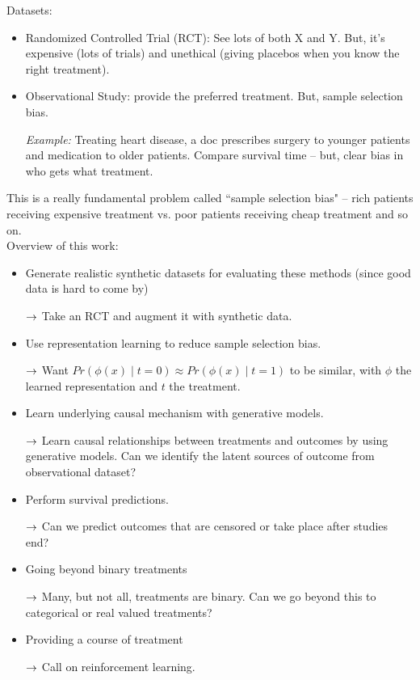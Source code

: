 Datasets:
\begin{itemize}
    \item Randomized Controlled Trial (RCT): See lots of both X and Y. But, it's expensive (lots of trials) and unethical (giving placebos when you know the right treatment).
    \item Observational Study: provide the preferred treatment. But, sample selection bias.
    
    {\it Example:} Treating heart disease, a doc prescribes surgery to younger patients and medication to older patients. Compare survival time -- but, clear bias in who gets what treatment.
\end{itemize}

This is a really fundamental problem called ``sample selection bias" -- rich patients receiving expensive treatment vs. poor patients receiving cheap treatment and so on. \\

Overview of this work:
\begin{itemize}
    \item Generate realistic synthetic datasets for evaluating these methods (since good data is hard to come by)
    
    $\rightarrow$ Take an RCT and augment it with synthetic data.
    
    \item Use representation learning to reduce sample selection bias.
    
    $\rightarrow$ Want $Pr(\phi(x) \mid t=0) \approx Pr(\phi(x) \mid t=1)$ to be similar, with $\phi$ the learned representation and $t$ the treatment.
    
    \item Learn underlying causal mechanism with generative models.
    
    $\rightarrow$ Learn causal relationships between treatments and outcomes by using generative models. Can we identify the latent sources of outcome from observational dataset?
    
    \item Perform survival predictions.
    
    $\rightarrow$ Can we predict outcomes that are censored or take place after studies end?
    
    \item Going beyond binary treatments
    
    $\rightarrow$ Many, but not all, treatments are binary. Can we go beyond this to categorical or real valued treatments?
    
    \item Providing a course of treatment
    
    $\rightarrow$ Call on reinforcement learning.

\end{itemize}



